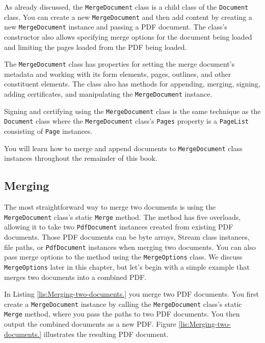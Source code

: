 \documentclass[american]{tufte-book}
\numberwithin{equation}{section}
\numberwithin{figure}{section}
\begin{document}
{{As already discussed, the \texttt{MergeDocument} class is a child
class of the \texttt{Document} class. You can create a new \texttt{MergeDocument}
and then add content by creating a new \texttt{MergeDocument} instance
and passing a PDF document. The class's constructor also allows specifying
merge options for the document being loaded and limiting the pages
loaded from the PDF being loaded. 

The \texttt{MergeDocument} class has properties for setting the merge
document's metadata and working with its form elements, pages, outlines,
and other constituent elements. The class also has methods for appending,
merging, signing, adding certificates, and manipulating the \texttt{MergeDocument}
instance.

Signing and certifying using the \texttt{MergeDocument} class is the
same technique as the \texttt{Document} class where the \texttt{MergeDocument}
class's \texttt{Pages} property is a \texttt{PageList} consisting
of \texttt{Page} instances. 

You will learn how to merge and append documents to \texttt{MergeDocument}
class instances throughout the remainder of this book.
\subsection{Merging}

The most straightforward way to merge two documents is using the \texttt{MergeDocument}
class's static \texttt{Merge} method. The method has five overloads,
allowing it to take two \texttt{PdfDocument} instances created from
existing PDF documents. Those PDF documents can be byte arrays, Stream
class instances, file paths, or \texttt{PdfDocument} instances when
merging two documents. You can also pass merge options to the method
using the \texttt{MergeOptions} class. We discuss \texttt{MergeOptions}
later in this chapter, but let's begin with a simple example that
merges two documents into a combined PDF.

In Listing \ref{lis:Merging-two-documents.} you merge two PDF documents.
You first create a \texttt{MergeDocument} instance by calling the
\texttt{MergeDocument} class's static \texttt{Merge} method, where
you pass the paths to two PDF documents. You then output the combined
documents as a new PDF. Figure \ref{lis:Merging-two-documents.} illustrates
the resulting PDF document.

}}
\end{document}
